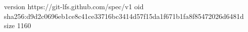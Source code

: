 version https://git-lfs.github.com/spec/v1
oid sha256:d9d2c0696eb1ce8c41ce33716bc3414d57f15da1f671b1fa8f85472026d6481d
size 1160
